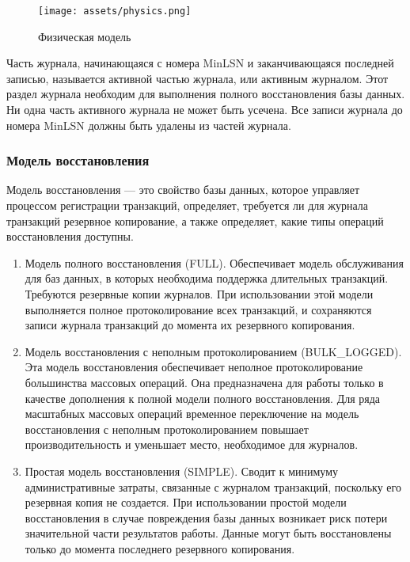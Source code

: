 \begin{figure}[ht!]
	\centering
	\texttt{[image: assets/physics.png]}
	\caption{Физическая модель} 
\end{figure}
\FloatBarrier

Часть журнала, начинающаяся с номера MinLSN и заканчивающаяся
последней записью,
называется активной частью журнала, или активным журналом. Этот
раздел журнала
необходим для выполнения полного восстановления базы данных. Ни одна
часть
активного журнала не может быть усечена. Все записи журнала до номера
MinLSN
должны быть удалены из частей журнала.

\subsubsection{Модель восстановления}

Модель восстановления --- это свойство базы данных, которое управляет процессом регистрации транзакций, определяет, требуется ли для журнала транзакций резервное копирование, а также определяет, какие типы операций восстановления доступны.

\begin{enumerate}
	\item Модель полного восстановления (FULL). Обеспечивает модель обслуживания для баз данных, в которых 
	необходима поддержка длительных транзакций. Требуются резервные копии журналов. При использовании этой 
	модели выполняется полное протоколирование всех транзакций, и сохраняются записи журнала транзакций до 
	момента их резервного копирования.
	\item Модель восстановления с неполным протоколированием (BULK\_LOGGED). Эта модель восстановления 
	обеспечивает неполное протоколирование большинства массовых операций. Она предназначена для работы только в 
	качестве дополнения к полной модели полного восстановления. Для ряда масштабных массовых операций временное переключение на модель восстановления с неполным протоколированием повышает производительность и уменьшает место, необходимое для журналов.
	\item Простая модель восстановления (SIMPLE). Сводит к минимуму административные затраты, связанные с 
	журналом транзакций, поскольку его резервная копия не создается. При использовании простой модели 
	восстановления в случае повреждения базы данных возникает риск потери значительной части результатов работы. 
	Данные могут быть восстановлены только до момента последнего резервного копирования.
\end{enumerate}

